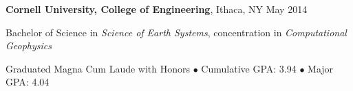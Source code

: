 

\textbf{Cornell University, College of Engineering}, Ithaca, NY \hfill May 2014

Bachelor of Science in \textit{Science of Earth Systems}, concentration in \textit{Computational Geophysics}

Graduated Magna Cum Laude with Honors $\bullet$ Cumulative GPA: 3.94 $\bullet$ Major GPA: 4.04
